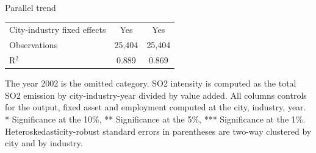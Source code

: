 \documentclass{beamer}
\begin{document}
\begin{frame}{Parallel trend}
\begin{table}[htbp]
\begin{adjustbox}{width=\textwidth,
        totalheight=\baselineskip,keepaspectratio}
\begin{threeparttable}
\begin{tabular}{l*{2}{c}}
                City-industry fixed effects & Yes & Yes  \\ 
                Observations & 25,404 & 25,404 \\ 
                R$^{2}$ & 0.889 & 0.869 \\  
                \bottomrule
            \end{tabular}
            \begin{tablenotes}
                \scriptsize
                \item The year 2002 is the omitted category. SO2 intensity is computed as the total SO2 emission by city-industry-year divided by value added. All columns controls for the output, fixed asset and employment computed at the city, industry, year. \\
                * Significance at the 10\%, ** Significance at the 5\%, *** Significance at the 1\%. Heteroskedasticity-robust standard errors in parentheses are two-way clustered by city and by industry.
            \end{tablenotes}
        \end{threeparttable}
        \end{adjustbox}
    \end{table}
\end{frame}
\end{document}
